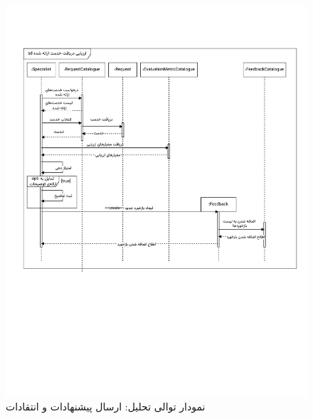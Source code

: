 \begin{figure}[ht!]
	\centering
	\includegraphics[scale=0.8, page=6]{figs/OOD-Sequence-3.pdf}
	\caption{نمودار توالی تحلیل: ارسال پیشنهادات و انتقادات}
\end{figure}

\FloatBarrier
\newpage

